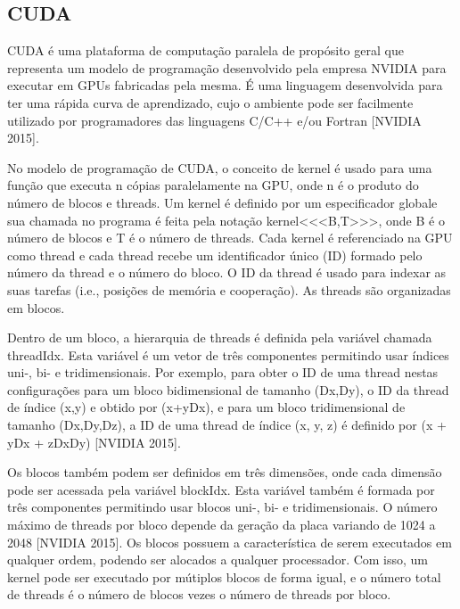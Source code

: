 \subsection{CUDA}

CUDA é uma plataforma de computação paralela de propósito geral que representa um modelo de programação desenvolvido pela empresa NVIDIA para executar em GPUs fabricadas pela mesma. É uma linguagem desenvolvida para ter uma rápida curva de aprendizado, cujo o ambiente pode ser facilmente utilizado por programadores das linguagens C/C++ e/ou Fortran [NVIDIA 2015].

No modelo de programação de CUDA, o conceito de kernel é usado para uma função que executa n cópias paralelamente na GPU, onde n é o produto do número de blocos e threads. Um kernel é definido por um especificador \textunderscore\textunderscore global\textunderscore\textunderscore  e sua chamada no programa é feita pela notação kernel\textless\textless\textless B,T\textgreater\textgreater\textgreater, onde B é o número de blocos e T é o número de threads. Cada kernel é referenciado na GPU como thread e cada thread recebe um identificador único (ID) formado pelo número da thread e o número do bloco. O ID da thread é usado para indexar as suas tarefas (i.e., posições de memória e cooperação). As threads são organizadas em blocos.


Dentro de um bloco, a hierarquia de threads é definida pela variável chamada threadIdx. Esta variável é um vetor de três componentes permitindo usar índices uni-, bi- e tridimensionais. Por exemplo, para obter o ID de uma thread nestas configurações para um bloco bidimensional de tamanho (Dx,Dy), o ID da thread de índice (x,y) e obtido por (x+yDx), e para um bloco tridimensional de tamanho (Dx,Dy,Dz), a ID de uma thread de índice (x, y, z) é definido por (x + yDx + zDxDy) [NVIDIA 2015].


Os blocos também podem ser definidos em três dimensões, onde cada dimensão pode ser acessada pela variável blockIdx. Esta variável também é formada por três componentes permitindo usar blocos uni-, bi- e tridimensionais. O número máximo de threads por bloco depende da geração da placa variando de 1024 a 2048 [NVIDIA 2015]. Os blocos possuem a característica de serem executados em qualquer ordem, podendo ser alocados a qualquer processador. Com isso, um kernel pode ser executado por mútiplos blocos de forma igual, e o número total de threads é o número de blocos vezes o número de threads por bloco.


